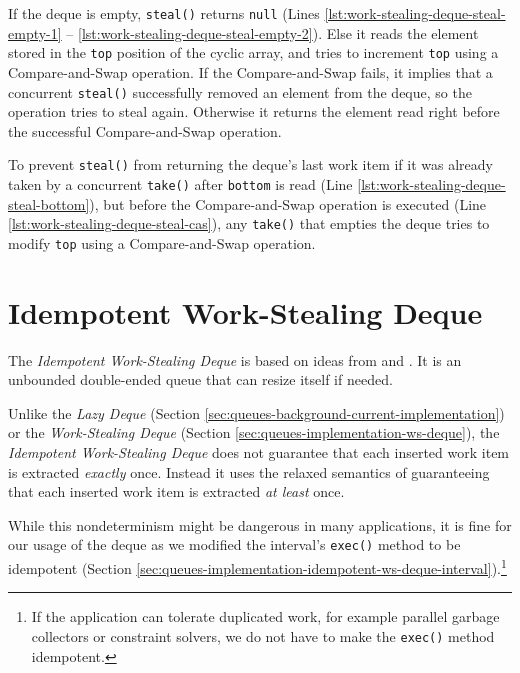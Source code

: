 If the deque is empty, \lstinline!steal()! returns \lstinline!null!
(Lines \ref{lst:work-stealing-deque-steal-empty-1} --
\ref{lst:work-stealing-deque-steal-empty-2}). Else it reads the
element stored in the \lstinline!top! position of the cyclic array,
and tries to increment \lstinline!top! using a Compare-and-Swap
operation. If the Compare-and-Swap fails, it implies that a concurrent
\lstinline!steal()! successfully removed an element from the deque, so
the operation tries to steal again. Otherwise it returns the element
read right before the successful Compare-and-Swap operation.

To prevent \lstinline!steal()! from returning the deque's last work
item if it was already taken by a concurrent \lstinline!take()! after
\lstinline!bottom! is read (Line
\ref{lst:work-stealing-deque-steal-bottom}), but before the
Compare-and-Swap operation is executed (Line
\ref{lst:work-stealing-deque-steal-cas}), any \lstinline!take()! that
empties the deque tries to modify \lstinline!top! using a
Compare-and-Swap operation.



\section{Idempotent Work-Stealing Deque}
\label{sec:queues-implementation-idempotent-ws-deque}

The \emph{Idempotent Work-Stealing Deque} is based on ideas from
\cite{Leijen2009} and \cite{Michael2009}. It is an unbounded
double-ended queue that can resize itself if needed.

Unlike the \emph{Lazy Deque} (Section
\ref{sec:queues-background-current-implementation}) or the
\emph{Work-Stealing Deque} (Section
\ref{sec:queues-implementation-ws-deque}), the \emph{Idempotent
Work-Stealing Deque} does not guarantee that each inserted work item
is extracted \emph{exactly} once. Instead it uses the relaxed
semantics of guaranteeing that each inserted work item is extracted
\emph{at least} once.

While this nondeterminism might be dangerous in many applications, it
is fine for our usage of the deque as we modified the interval's
\lstinline!exec()! method to be idempotent (Section
\ref{sec:queues-implementation-idempotent-ws-deque-interval}).\footnote{If
  the application can tolerate duplicated work, for example parallel
  garbage collectors \cite{Flood2001} or constraint solvers, we do not
  have to make the \verb!exec()! method idempotent.}

